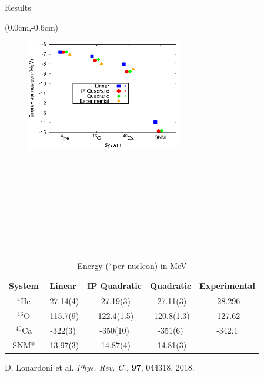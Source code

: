 \documentclass{beamer}
\begin{document}
\begin{frame}{Results}
\begin{textblock*}{\textwidth}(0.0cm,-0.6cm) %
\begin{figure}[h]
   \centering
   \includegraphics[width=0.6\textwidth]{energy.eps}
\end{figure}
\end{textblock*}
~\\~\\~\\~\\~\\~\\~\\~\\
\tiny
\begin{table}[htb]
\centering
\caption[]{Energy (*per nucleon) in MeV}
\begin{tabular}{ccccc}
\hline\hline
System & Linear & IP Quadratic & Quadratic & Experimental\\
\hline
${}^{4}${He}   & -27.14(4) & -27.19(3)    & -27.11(3)    & -28.296   \\
${}^{16}${O}   & -115.7(9) & -122.4(1.5)  & -120.8(1.3)  & -127.62   \\
${}^{40}${Ca}  & -322(3)   & -350(10)     & -351(6)      & -342.1    \\
SNM*           & -13.97(3) & -14.87(4)    & -14.81(3)    &           \\
\hline\hline
\end{tabular}
\label{tab:psi2}
\end{table}
{\tiny D. Lonardoni et al. \textit{Phys. Rev. C.,} \textbf{97}, 044318, 2018.}
\end{frame}
\end{document}
